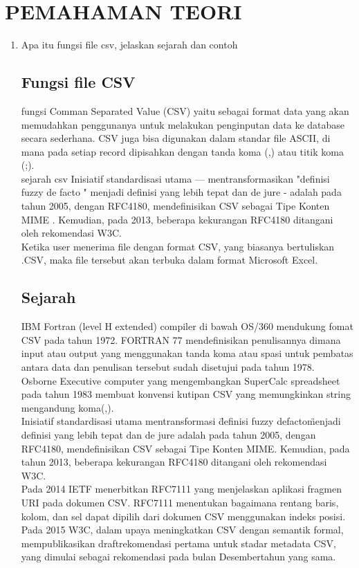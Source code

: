 \documentclass[a4paper, 12pt]{article}
\begin{document}
\section{PEMAHAMAN TEORI}
\begin{enumerate}
\item Apa itu fungsi file csv, jelaskan sejarah dan contoh
\subsection{Fungsi file CSV}
fungsi  Comman Separated Value (CSV) yaitu sebagai format data yang akan memudahkan penggunanya untuk melakukan penginputan data ke database secara sederhana. CSV juga bisa digunakan dalam standar file ASCII, di mana pada setiap record dipisahkan dengan tanda koma (,) atau titik koma (;).\\ sejarah csv Inisiatif standardisasi utama — mentransformasikan "definisi fuzzy de facto " menjadi definisi yang lebih tepat dan de jure - adalah pada tahun 2005, dengan RFC4180, mendefinisikan CSV sebagai Tipe Konten MIME . Kemudian, pada 2013, beberapa kekurangan RFC4180 ditangani oleh rekomendasi W3C.\\
Ketika user menerima file dengan format CSV, yang biasanya bertuliskan .CSV, maka file tersebut akan terbuka dalam format Microsoft Excel.
\subsection{Sejarah}
	IBM Fortran (level H extended) compiler di bawah OS/360 mendukung fomat CSV pada tahun 1972. FORTRAN 77 mendefinisikan penulisannya dimana input atau output yang menggunakan tanda koma atau spasi untuk pembatas antara data dan penulisan tersebut sudah disetujui pada tahun 1978.
\\	Osborne Executive computer yang mengembangkan SuperCalc       spreadsheet pada tahun 1983 membuat konvensi kutipan CSV      yang memungkinkan string mengandung koma(,).
\\
	Inisiatif standardisasi utama \- mentransformasi \"definisi fuzzy defacto\" menjadi definisi yang lebih tepat dan de jure \-adalah pada tahun 2005, dengan RFC4180, mendefinisikan CSV sebagai Tipe Konten MIME. Kemudian, pada tahun 2013, beberapa kekurangan RFC4180 ditangani oleh rekomendasi W3C.
\\
	Pada 2014 IETF menerbitkan RFC7111 yang menjelaskan aplikasi fragmen URI pada dokumen CSV. RFC7111 menentukan bagaimana rentang baris, kolom, dan sel dapat dipilih dari dokumen CSV menggunakan indeks posisi.
\\
	Pada 2015 W3C, dalam upaya meningkatkan CSV dengan semantik formal, mempublikasikan draftrekomendasi pertama untuk stadar metadata CSV, yang dimulai sebagai rekomendasi pada bulan Desembertahun yang sama.


\end{enumerate}
\end{document}
